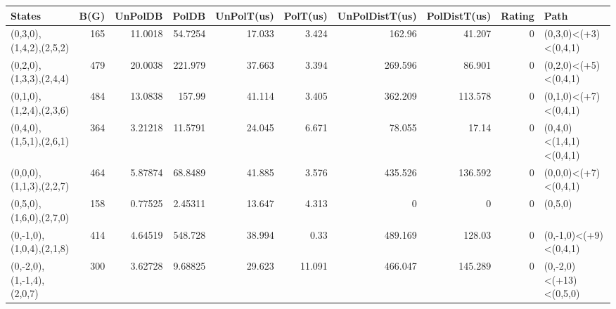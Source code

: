 \begin{tabular}{lrrrrrrrrl}
\hline
 States                    &   B(G) &   UnPolDB &     PolDB &   UnPolT(us) &   PolT(us) &   UnPolDistT(us) &   PolDistT(us) &   Rating & Path                    \\
\hline
 (0,3,0),(1,4,2),(2,5,2)   &    165 &  11.0018  &  54.7254  &       17.033 &      3.424 &          162.96  &         41.207 &        0 & (0,3,0)<(+3)<(0,4,1)    \\
 (0,2,0),(1,3,3),(2,4,4)   &    479 &  20.0038  & 221.979   &       37.663 &      3.394 &          269.596 &         86.901 &        0 & (0,2,0)<(+5)<(0,4,1)    \\
 (0,1,0),(1,2,4),(2,3,6)   &    484 &  13.0838  & 157.99    &       41.114 &      3.405 &          362.209 &        113.578 &        0 & (0,1,0)<(+7)<(0,4,1)    \\
 (0,4,0),(1,5,1),(2,6,1)   &    364 &   3.21218 &  11.5791  &       24.045 &      6.671 &           78.055 &         17.14  &        0 & (0,4,0)<(1,4,1)<(0,4,1) \\
 (0,0,0),(1,1,3),(2,2,7)   &    464 &   5.87874 &  68.8489  &       41.885 &      3.576 &          435.526 &        136.592 &        0 & (0,0,0)<(+7)<(0,4,1)    \\
 (0,5,0),(1,6,0),(2,7,0)   &    158 &   0.77525 &   2.45311 &       13.647 &      4.313 &            0     &          0     &        0 & (0,5,0)                 \\
 (0,-1,0),(1,0,4),(2,1,8)  &    414 &   4.64519 & 548.728   &       38.994 &      0.33  &          489.169 &        128.03  &        0 & (0,-1,0)<(+9)<(0,4,1)   \\
 (0,-2,0),(1,-1,4),(2,0,7) &    300 &   3.62728 &   9.68825 &       29.623 &     11.091 &          466.047 &        145.289 &        0 & (0,-2,0)<(+13)<(0,5,0)  \\
\hline
\end{tabular}